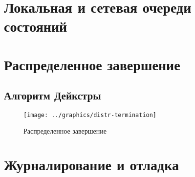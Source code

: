 \section{Локальная и сетевая очереди состояний}
\label{sec:local-network-queue}

\section{Распределенное завершение}
\label{sec:distributed-termination}

\subsection{Алгоритм Дейкстры}
\label{sec:distr-term-dijkstra}

\begin{figure}[ht]
  \centering
  \texttt{[image: ../graphics/distr-termination]}  
  \caption{Распределенное завершение}
\label{fig:dist-term}
\end{figure}

\section{Журналирование и отладка}
\label{sec:mpi-logging}



